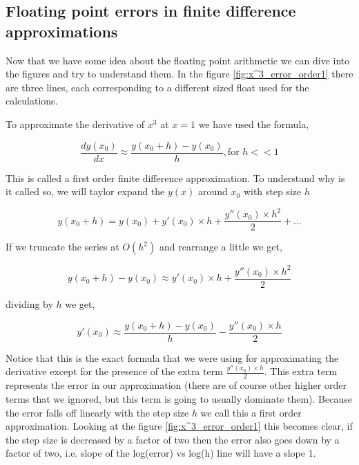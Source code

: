 \subsection{Floating point errors in finite difference approximations}
\label{chap3:floating_point_errors}
Now that we have some idea about the floating point arithmetic we can dive into the figures and try to understand them.
In the figure \ref{fig:x^3_error_order1} there are three lines, each corresponding to a different sized float used for the calculations.

To approximate the derivative of $x^3$ at $x=1$ we have used the formula,

\begin{equation}
    \frac{dy(x_0)}{dx} \approx \frac{y(x_0 + h) - y(x_0)}{h} , \text{for } h << 1
    \label{eq:first_order_2}
\end{equation}

This is called a  first order finite difference approximation. To understand why is it called so, we will taylor expand the $y(x)$ around $x_0$ with step size $h$

\begin{equation}
    y(x_0 + h) = y(x_0) + y'(x_0) \times h +\frac{y''(x_0) \times h^2}{2} + \dots
\end{equation}

If we truncate the series at $O(h^2)$ and rearrange a little we get,

\begin{equation}
    y(x_0 + h) - y(x_0) \approx y'(x_0) \times h +\frac{y''(x_0) \times h^2}{2}
\end{equation}

dividing by $h$ we get,

\begin{equation}
    y'(x_0)  \approx \frac{y(x_0 + h) - y(x_0)}{h} - \frac{y''(x_0) \times h}{2}
    \label{eq:1d_1o_error}
\end{equation}

Notice that this is the exact formula that we were using for approximating the derivative except for the presence of the extra term $\frac{y''(x_0) \times h}{2}$. This extra term represents the error in our approximation (there are of course other higher order terms that we ignored, but this term is going to usually dominate them). Because the error falls off linearly with the step size $h$ we call this a first order approximation. Looking at the figure \ref{fig:x^3_error_order1} this becomes clear, if the step size is decreased by a factor of two then the error also goes down by a factor of two, i.e. slope of the log(error) vs log(h) line will have a slope 1.

